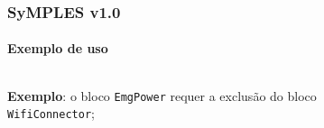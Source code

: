 \begin{frame}
\frametitle{SyMPLES v1.0}
\framesubtitle{Exemplo de uso}
  
  \begin{columns}[onlytextwidth]
    
    \begin{column}{0.4\textwidth}
      \textbf{Exemplo}: o bloco \texttt{EmgPower} requer a exclusão do bloco \texttt{WifiConnector};
    \end{column}
  
    \begin{column}{0.6\textwidth}
      \begin{figure}
      \end{figure}
    \end{column}
    
  \end{columns}

\end{frame}
